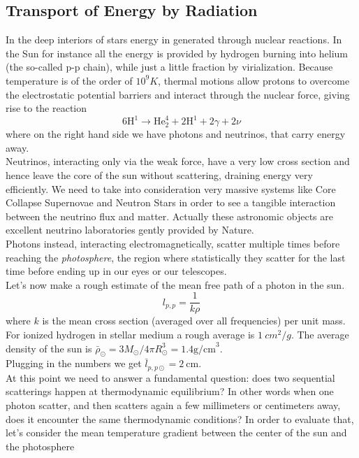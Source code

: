 \subsection{Transport of Energy by Radiation}
In the deep interiors of stars energy in generated through nuclear reactions. In the Sun for instance all the energy is provided by hydrogen burning into helium (the so-called p-p chain), while just a little fraction by virialization. Because temperature is of the order of $10^9 K$, thermal motions allow protons to overcome the electrostatic potential barriers and interact through the nuclear force, giving rise to the reaction
\begin{equation}\label{ppchain}
	6 \mathrm{H}^1 \to \mathrm{He}^4_2 + 2 \mathrm{H}^1 + 2 \gamma + 2 \nu
\end{equation}
where on the right hand side we have photons and neutrinos, that carry energy away. \\
Neutrinos, interacting only via the weak force, have a very low cross section and hence leave the core of the sun without scattering, draining energy very efficiently. We need to take into consideration very massive systems like Core Collapse Supernovae and Neutron Stars in order to see a tangible interaction between the neutrino flux and matter. Actually these astronomic objects are excellent neutrino laboratories gently provided by Nature. \\
Photons instead, interacting electromagnetically, scatter multiple times before reaching the \textit{photosphere}, the region where statistically they scatter for the last time before ending up in our eyes or our telescopes. \\
Let's now make a rough estimate of the mean free path of a photon in the sun. 
\begin{equation}\label{mfp}
	l_{p,p}=\frac{1}{k \rho}
\end{equation}
where $k$ is the mean cross section (averaged over all frequencies) per unit mass. For ionized hydrogen in stellar medium a rough average is $1 \ cm^2/g$. The average density of the sun is $\bar\rho_{\odot}=3M_{\odot}/4 \pi R_{\odot}^3= 1.4 \mathrm{g /cm}^3$. \\
Plugging in the numbers we get $\bar l_{p,p \odot}=2 \  \mathrm{cm}$. \\
At this point we need to answer a fundamental question: does two sequential scatterings happen at thermodynamic equilibrium? In other words when one photon scatter, and then scatters again a few millimeters or centimeters away, does it encounter the same thermodynamic conditions? In order to evaluate that, let's consider the mean temperature gradient between the center of the sun and the photosphere
